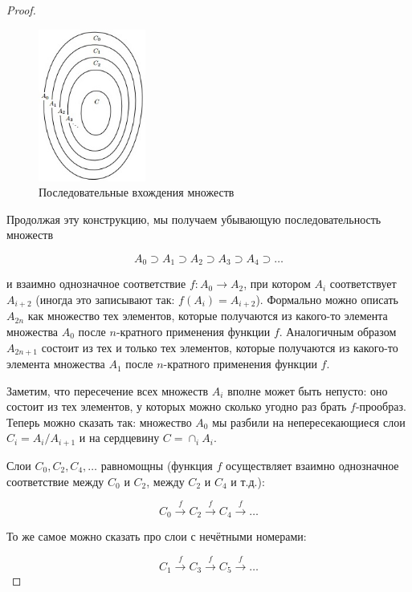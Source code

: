 \documentclass[a4paper, 12pt]{article}
\begin{document}
\begin{proof}
 \begin{figure}[h]
\begin{center}
\begin{minipage}[h]{0.4\linewidth}
 \includegraphics[height=5cm, width=\linewidth]{images/kantorbern2.jpg}
 \caption{Последовательные вхождения множеств}
 \end{minipage}
 \end{center}
 \end{figure}
 
 Продолжая эту конструкцию, мы получаем убывающую последовательность множеств
 
 \[A_0 \supset A_1 \supset A_2 \supset A_3 \supset A_4 \supset \ldots\]

 и взаимно однозначное соответствие $f : A_0 \rightarrow A_2$, при котором $A_i$ соответствует $A_{i + 2}$ (иногда это записывают так: $f(A_i) = A_{i+2}$). Формально можно описать $A_{2n}$ как множество тех элементов, которые получаются из какого-то элемента множества $A_0$ после $n$-кратного применения функции $f$. Аналогичным образом $A_{2n + 1}$ состоит из тех и только тех элементов, которые получаются из какого-то элемента множества $A_1$ после $n$-кратного применения функции $f$.
 
 Заметим, что пересечение всех множеств $A_i$ вполне может быть непусто: оно состоит из тех элементов, у которых можно сколько угодно раз брать $f$-прообраз. Теперь можно сказать так: множество $A_0$ мы разбили на непересекающиеся слои $C_i = A_i / A_{i+1}$ и на
сердцевину $C =\cap_i A_i$.

 Слои $C_0, C_2, C_4, \ldots$ равномощны (функция $f$ осуществляет взаимно однозначное соответствие между $C_0$ и $C_2$, между $C_2$ и $C_4$ и т.д.):

\[C_0 \xrightarrow{f} C_2 \xrightarrow{f} C_4 \xrightarrow{f} \ldots\]

То же самое можно сказать про слои с нечётными номерами:

\[C_1 \xrightarrow{f} C_3 \xrightarrow{f} C_5 \xrightarrow{f} \ldots\]


\end{proof}
\end{document}
